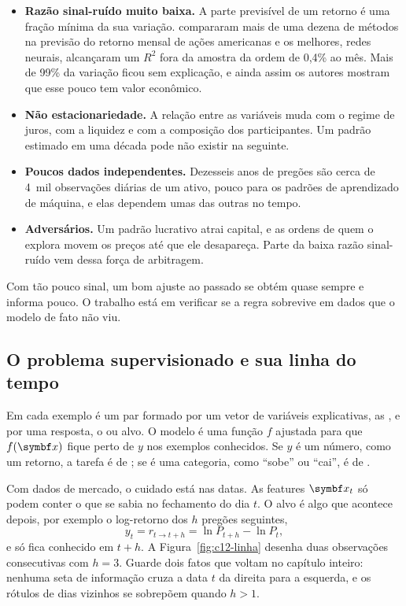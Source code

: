 \begin{itemize}
  \item \textbf{Razão sinal-ruído muito baixa.} A parte previsível de um retorno é uma fração mínima da sua variação. \citet{gu2020} compararam mais de uma dezena de métodos na previsão do retorno mensal de ações americanas e os melhores, redes neurais, alcançaram um $R^2$ fora da amostra da ordem de 0,4\% ao mês. Mais de 99\% da variação ficou sem explicação, e ainda assim os autores mostram que esse pouco tem valor econômico.
  \item \textbf{Não estacionariedade.} A relação entre as variáveis muda com o regime de juros, com a liquidez e com a composição dos participantes. Um padrão estimado em uma década pode não existir na seguinte.
  \item \textbf{Poucos dados independentes.} Dezesseis anos de pregões são cerca de 4~mil observações diárias de um ativo, pouco para os padrões de aprendizado de máquina, e elas dependem umas das outras no tempo.
  \item \textbf{Adversários.} Um padrão lucrativo atrai capital, e as ordens de quem o explora movem os preços até que ele desapareça. Parte da baixa razão sinal-ruído vem dessa força de arbitragem.
\end{itemize}

Com tão pouco sinal, um bom ajuste ao passado se obtém quase sempre e informa pouco. O trabalho está em verificar se a regra sobrevive em dados que o modelo de fato não viu.

\subsection{O problema supervisionado e sua linha do tempo}

Em  cada exemplo é um par formado por um vetor de variáveis explicativas, as , e por uma resposta, o  ou alvo. O modelo é uma função $f$ ajustada para que $f(\vetor{x})$ fique perto de $y$ nos exemplos conhecidos. Se $y$ é um número, como um retorno, a tarefa é de ; se é uma categoria, como ``sobe'' ou ``cai'', é de .

Com dados de mercado, o cuidado está nas datas. As features $\vetor{x}_t$ só podem conter o que se sabia no fechamento do dia $t$. O alvo é algo que acontece depois, por exemplo o log-retorno dos $h$ pregões seguintes,
\begin{equation}
  y_t = r_{t \to t+h} = \ln P_{t+h} - \ln P_t ,
  \label{eq:c12-alvo}
\end{equation}
e só fica conhecido em $t+h$. A Figura~\ref{fig:c12-linha} desenha duas observações consecutivas com $h=3$. Guarde dois fatos que voltam no capítulo inteiro: nenhuma seta de informação cruza a data $t$ da direita para a esquerda, e os rótulos de dias vizinhos se sobrepõem quando $h > 1$.

